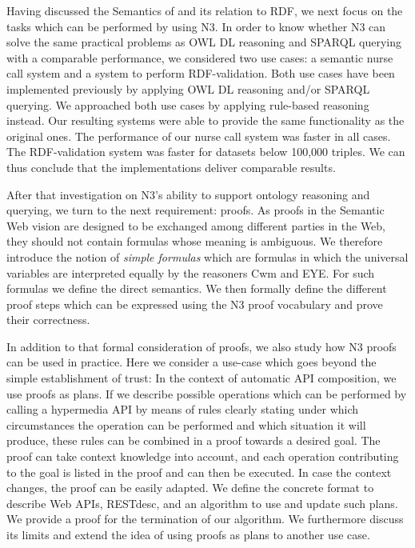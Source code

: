 Having discussed the Semantics of \nthree and its relation to RDF, we next focus on the tasks which can be performed by using N3. In order to know 
whether N3 can solve the same practical problems as OWL DL reasoning and SPARQL querying with a comparable performance, we considered two use cases: a semantic nurse call 
system and a system to perform RDF-validation. Both use cases have been implemented previously by applying OWL DL reasoning and/or SPARQL querying.
We approached both use cases by applying rule-based reasoning instead. Our resulting systems were able to provide the same functionality as the original ones.
The performance of our nurse call system was faster in all cases.  
The RDF-validation system was faster for datasets below 100,000 triples. We can thus conclude that the implementations deliver comparable results.

After that investigation on N3's ability to support ontology reasoning and querying, we turn to the next requirement: proofs. 
As proofs in the Semantic Web vision are designed to be exchanged among different parties in the Web, they should not contain formulas whose meaning is ambiguous.
We therefore introduce the notion of \emph{simple formulas} which are formulas in which the universal variables are interpreted equally by the reasoners Cwm and EYE. 
For such formulas we define the direct semantics. We then formally define the different proof steps which can be expressed 
using the N3 proof vocabulary and prove their correctness.

In addition to that formal consideration of proofs, we also study how N3 proofs can be used in practice. Here we consider a use-case which goes beyond the simple establishment of trust:
In the context of automatic API composition, we use proofs as plans. If we describe possible operations
which can be performed by calling a hypermedia API by means of rules clearly stating under which circumstances 
 the operation can be performed and which situation it will produce, these rules can be combined in a proof towards a desired goal.
The proof can take context knowledge into account, and each operation contributing to the goal is listed in the proof and can then be executed. In case the context changes,
the proof can be easily adapted. We define the concrete format to describe Web APIs, RESTdesc, and an algorithm to use and update such plans. We provide a proof for 
the termination of our algorithm. We furthermore discuss its limits and extend the idea of using proofs as plans to another use case.

